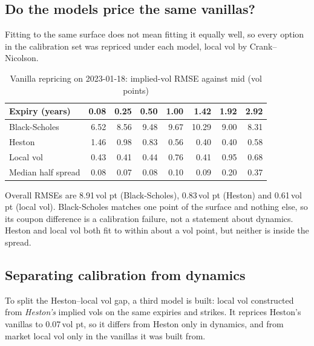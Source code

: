 \documentclass[10pt,letterpaper]{article}
\newcommand{\vp}{\,vol pt}
\begin{document}
\subsection{Do the models price the same vanillas?}
Fitting to the same surface does not mean fitting it equally well, so every option in the calibration set was repriced
under each model, local vol by Crank--Nicolson.

\begin{table}[H]
\caption{Vanilla repricing on 2023-01-18: implied-vol RMSE against mid (vol points)}\label{tab:reprice}
\centering\small
\begin{tabular}{lrrrrrrr}
\toprule
\textbf{Expiry (years)} & 0.08 & 0.25 & 0.50 & 1.00 & 1.42 & 1.92 & 2.92\\
\midrule
Black-Scholes & 6.52 & 8.56 & 9.48 & 9.67 & 10.29 & 9.00 & 8.31\\
Heston & 1.46 & 0.98 & 0.83 & 0.56 & 0.40 & 0.40 & 0.58\\
Local vol & 0.43 & 0.41 & 0.44 & 0.76 & 0.41 & 0.95 & 0.68\\
Median half spread & 0.08 & 0.07 & 0.08 & 0.10 & 0.09 & 0.20 & 0.37\\
\bottomrule
\end{tabular}
\end{table}

Overall RMSEs are 8.91\vp{} (Black-Scholes), 0.83\vp{} (Heston) and 0.61\vp{} (local vol). Black-Scholes matches one point
of the surface and nothing else, so its coupon difference is a calibration failure, not a statement about dynamics. Heston
and local vol both fit to within about a vol point, but neither is inside the spread.

\subsection{Separating calibration from dynamics}
To split the Heston--local vol gap, a third model is built: local vol constructed from \emph{Heston's} implied vols on the same
expiries and strikes. It reprices Heston's vanillas to 0.07\vp, so it differs from Heston only in dynamics, and from market local
vol only in the vanillas it was built from.
\end{document}
